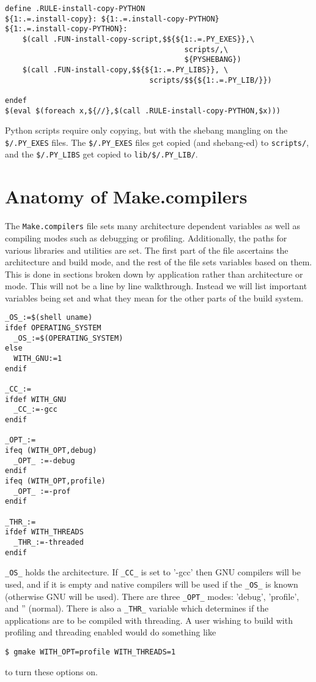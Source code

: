\documentclass[letterpaper]{article}
\begin{document}
\begin{verbatim}
define .RULE-install-copy-PYTHON
${1:.=.install-copy}: ${1:.=.install-copy-PYTHON}
${1:.=.install-copy-PYTHON}:
	$(call .FUN-install-copy-script,$${${1:.=.PY_EXES}},\
                                         scripts/,\
                                         ${PYSHEBANG})
	$(call .FUN-install-copy,$${${1:.=.PY_LIBS}}, \
                                 scripts/$${${1:.=.PY_LIB/}})

endef
$(eval $(foreach x,${//},$(call .RULE-install-copy-PYTHON,$x)))
\end{verbatim}
Python scripts require only copying, but with the shebang mangling
on the \verb+$/.PY_EXES+ files.  The \verb+$/.PY_EXES+ files get
copied (and shebang-ed) to \verb+scripts/+, and the
\verb+$/.PY_LIBS+ get copied to \verb+lib/$/.PY_LIB/+.

\section{Anatomy of Make.compilers}

The \verb+Make.compilers+ file sets many architecture dependent
variables as well as compiling modes such as debugging or profiling.
Additionally, the paths for various libraries and utilities are set.
The first part of the file ascertains the architecture and build mode,
and the rest of the file sets variables based on them.  This is done
in sections broken down by application rather than architecture or
mode.  This will not be a line by line walkthrough.  Instead we will
list important variables being set and what they mean for the other
parts of the build system.

\begin{verbatim}
_OS_:=$(shell uname)
ifdef OPERATING_SYSTEM
  _OS_:=$(OPERATING_SYSTEM)
else
  WITH_GNU:=1
endif

_CC_:=
ifdef WITH_GNU
  _CC_:=-gcc
endif

_OPT_:=
ifeq (WITH_OPT,debug)
  _OPT_ :=-debug
endif
ifeq (WITH_OPT,profile)
  _OPT_ :=-prof
endif

_THR_:=
ifdef WITH_THREADS
  _THR_:=-threaded
endif
\end{verbatim}
\verb+_OS_+ holds the architecture.  If \verb+_CC_+ is set to '-gcc'
then GNU compilers will be used, and if it is empty and native
compilers will be used if the \verb+_OS_+ is known (otherwise GNU
will be used).  There are three \verb+_OPT_+ modes: 'debug', 'profile',
and '' (normal).  There is also a \verb+_THR_+ variable which determines
if the applications are to be compiled with threading.  A user wishing
to build with profiling and threading enabled would do something like
\begin{verbatim}
$ gmake WITH_OPT=profile WITH_THREADS=1
\end{verbatim}
to turn these options on.
\end{document}
